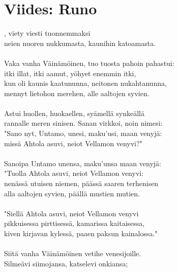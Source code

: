 
\chapter*{Viides: Runo}

, viety viesti tuonnemmaksi\\
neien nuoren nukkumasta, kaunihin katoamasta.            \\
                                                         \\
Vaka vanha Väinämöinen, tuo tuosta pahoin pahastui:      \\
itki illat, itki aamut, yöhyet enemmin itki,             \\
kun oli kaunis kaatununna, neitonen nukahtanunna,        \\
mennyt lietohon merehen, alle aaltojen syvien.           \\
                                                         \\
Astui huollen, huokaellen, syämellä synkeällä            \\
rannalle meren sinisen. Sanan virkkoi, noin nimesi:      \\
"Sano nyt, Untamo, unesi, maku'usi, maan venyjä:         \\
missä Ahtola asuvi, neiot Vellamon venyvi?"              \\
                                                         \\
Sanoipa Untamo unensa, maku'unsa maan venyjä:            \\
"Tuolla Ahtola asuvi, neiot Vellamon venyvi:             \\
nenässä utuisen niemen, päässä saaren terhenisen         \\
alla aaltojen syvien, päällä mustien mutien.             \\
                                                         \\
"Siellä Ahtola asuvi, neiot Vellamon venyvi              \\
pikkuisessa pirttisessä, kamarissa kaitaisessa,          \\
kiven kirjavan kylessä, paaen paksun kainalossa."        \\
                                                         \\
Siitä vanha Väinämöinen vetihe venesijoille.             \\
Silmeävi siimojansa, katselevi onkiansa;                 \\
